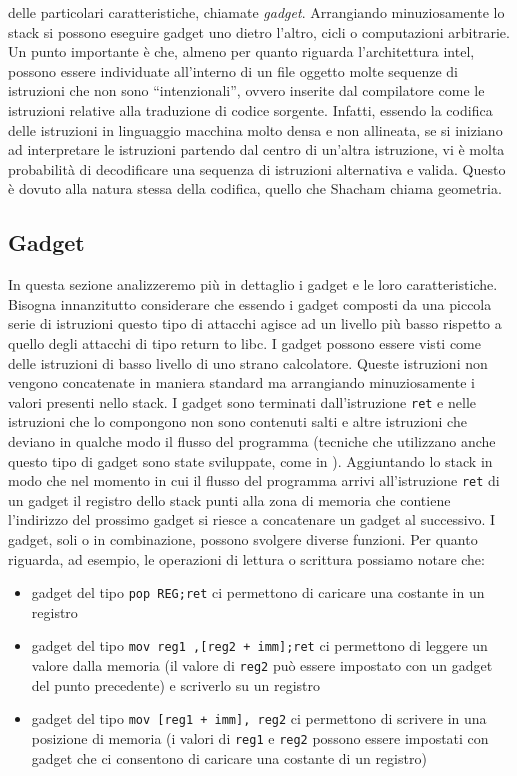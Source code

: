 delle particolari caratteristiche, chiamate \emph{gadget}. Arrangiando
minuziosamente lo stack si possono eseguire gadget uno dietro l'altro,
cicli o computazioni arbitrarie. Un punto importante è che, almeno per
quanto riguarda l'architettura intel, possono essere individuate
all'interno di un file oggetto molte sequenze di istruzioni che non
sono ``intenzionali'', ovvero inserite dal compilatore come le
istruzioni relative alla traduzione di codice sorgente. Infatti,
essendo la codifica delle istruzioni in linguaggio macchina molto
densa e non allineata, se si iniziano ad interpretare le istruzioni
partendo dal centro di un'altra istruzione, vi è molta probabilità di
decodificare una sequenza di istruzioni alternativa e valida. Questo è
dovuto alla natura stessa della codifica, quello che Shacham chiama
geometria.

\subsection{Gadget}

In questa sezione analizzeremo più in dettaglio i gadget e le loro
caratteristiche. Bisogna innanzitutto considerare che essendo i gadget
composti da una piccola serie di istruzioni questo tipo di attacchi
agisce ad un livello più basso rispetto a quello degli attacchi di
tipo return to libc. I gadget possono essere visti come delle
istruzioni di basso livello di uno strano calcolatore. Queste
istruzioni non vengono concatenate in maniera standard ma arrangiando
minuziosamente i valori presenti nello stack. I gadget sono terminati
dall'istruzione \lstinline{ret} e nelle istruzioni che lo compongono
non sono contenuti salti e altre istruzioni che deviano in qualche
modo il flusso del programma (tecniche che utilizzano anche questo
tipo di gadget sono state sviluppate, come in
\cite{JOP}). Aggiuntando lo stack in modo che nel momento in cui il
flusso del programma arrivi all'istruzione \lstinline{ret} di un
gadget il registro dello stack punti alla zona di memoria che contiene
l'indirizzo del prossimo gadget si riesce a concatenare un gadget al
successivo. I gadget, soli o in combinazione, possono svolgere diverse
funzioni. Per quanto riguarda, ad esempio, le operazioni di lettura o
scrittura possiamo notare che:

\begin{itemize}
\item gadget del tipo \lstinline{pop REG;ret} ci permettono di
caricare una costante in un registro

\item gadget del tipo \lstinline{mov reg1 ,[reg2 + imm];ret} ci
  permettono di leggere un valore dalla memoria (il valore di
  \lstinline{reg2} può essere impostato con un gadget del punto
  precedente) e scriverlo su un registro

\item gadget del tipo \lstinline{mov [reg1 + imm], reg2} ci permettono
  di scrivere in una posizione di memoria (i valori di
  \lstinline{reg1} e \lstinline{reg2} possono essere impostati con
  gadget che ci consentono di caricare una costante di un registro)
\end{itemize}

